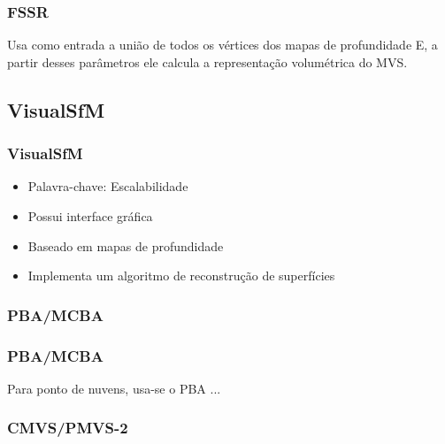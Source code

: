 \documentclass[table, usenames, svgnames, xcolor=dvipsnames]{beamer}
\begin{document}
\begin{frame}
\frametitle{\textbf{FSSR}}
	\begin{center}
	Usa como entrada a união de todos os vértices dos mapas de profundidade
	E, a partir desses parâmetros ele calcula a representação volumétrica do MVS.
	\end{center}
\end{frame}


\subsection{VisualSfM}

\begin{frame} 
\frametitle{\textbf{VisualSfM}}
	\begin{center}
		\begin{itemize}
			\item {Palavra-chave: Escalabilidade}
			\item {Possui interface gráfica}
			\item {Baseado em mapas de profundidade}
			\item {Implementa um algoritmo de reconstrução de superfícies}
		\end{itemize}
	\end{center}
\end{frame}

\subsubsection{PBA/MCBA}

\begin{frame} 
\frametitle{\textbf{PBA/MCBA}}
	\begin{center}
Para ponto de nuvens, usa-se o PBA ...
	\end{center}
\end{frame}

\subsubsection{CMVS/PMVS-2}
\end{document}
